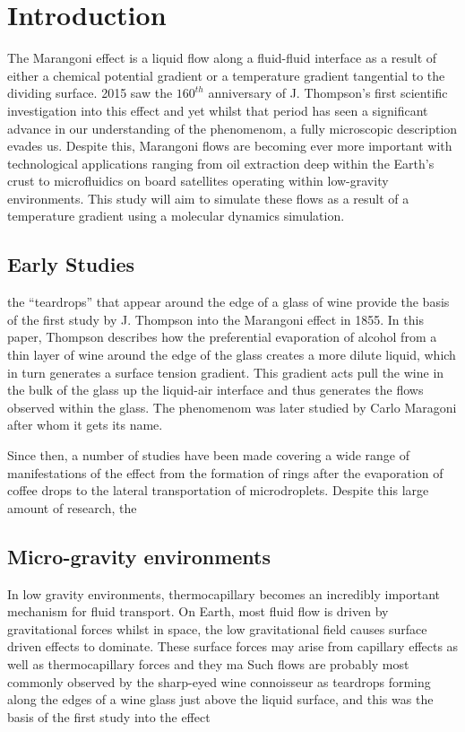 \chapter{Introduction}
The Marangoni effect is a liquid flow along a fluid-fluid interface as a result of either a chemical potential gradient or a temperature gradient tangential to the dividing surface.
2015 saw the $160^{th}$ anniversary of J. Thompson's first scientific investigation into this effect and yet whilst that period has seen a significant advance in our understanding of the phenomenom, a fully microscopic description evades us.
Despite this, Marangoni flows are becoming ever more important with technological applications ranging from oil extraction deep within the Earth's crust to microfluidics on board satellites operating within low-gravity environments.
This study will aim to simulate these flows as a result of a temperature gradient using a molecular dynamics simulation.

\section{Early Studies} 
the ``teardrops'' that appear around the edge of a glass of wine provide the basis of the first study by J. Thompson into the Marangoni effect in 1855\cite{Thompson1855}.
In this paper, Thompson describes how the preferential evaporation of alcohol from a thin layer of wine around the edge of the glass creates a more dilute liquid, which in turn generates a surface tension gradient.
This gradient acts pull the wine in the bulk of the glass up the liquid-air interface and thus generates the flows observed within the glass.
The phenomenom was later studied by Carlo Maragoni after whom it gets its name.

Since then, a number of studies have been made covering a wide range of manifestations of the effect from the formation of rings after the evaporation of coffee drops to the lateral transportation of microdroplets.
Despite this large amount of research, the 

\section{Micro-gravity environments}
In low gravity environments, thermocapillary becomes an incredibly important mechanism for fluid transport.
On Earth, most fluid flow is driven by gravitational forces whilst in space, the low gravitational field causes surface driven effects to dominate.
These surface forces may arise from capillary effects as well as thermocapillary forces and they ma
Such flows are probably most commonly observed by the sharp-eyed wine connoisseur as teardrops forming along the edges of a wine glass just above the liquid surface, and this was the basis of the first study into the effect  

